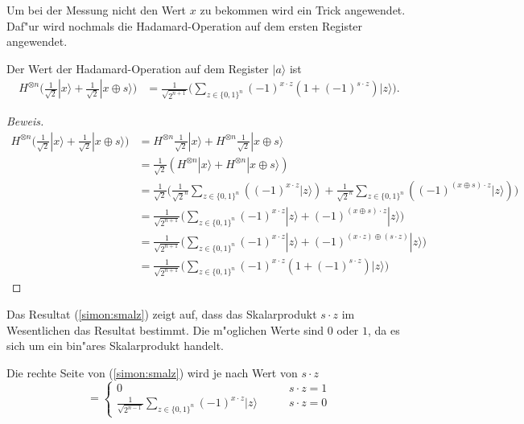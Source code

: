 \begin{refsection}
Um bei der Messung nicht den Wert $x$ zu bekommen wird ein Trick angewendet.
Daf"ur wird nochmals die Hadamard-Operation auf dem ersten Register angewendet.
\begin{hilfssatz}
Der Wert der Hadamard-Operation auf dem Register $|a\rangle$ ist
  \begin{align}
    H^{ \otimes n } \biggl( 
                     \frac{1}{\sqrt{2}} |x\rangle + 
                     \frac{1}{\sqrt{2}} |x \oplus s\rangle 
                     \biggr)
    &= \frac1{\sqrt{2^{n + 1}}}
       \biggl( 
          \sum_{z \in \{0,1\}^n}  { (-1)^{x \cdot z} ( 1 + (-1)^{ s \cdot z}) |z\rangle } 
       \biggr).
  \label{simon:smalz}
\end{align}
\end{hilfssatz}

\begin{proof}[Beweis]
\begin{align*}
    H^{ \otimes n } \biggl( 
                     \frac{1}{\sqrt{2}} |x\rangle + 
                     \frac{1}{\sqrt{2}} |x \oplus s\rangle 
                     \biggr)
    &= H^{ \otimes n } \frac{1}{\sqrt{2}} |x\rangle + 
       H^{ \otimes n } \frac{1}{\sqrt{2}} |x \oplus s\rangle 
    \\ 
    &= \frac1{\sqrt{2}} ( H^{ \otimes n } |x\rangle + H^{ \otimes n } |x \oplus s\rangle )
    \\
    &= \frac1{\sqrt{2}}
       \biggl( \frac1{\sqrt{2}^n} \sum_{z \in \{0,1\}^n} {( (-1)^{x \cdot z} |z\rangle )} + 
               \frac1{\sqrt{2}^n}  \sum_{z \in \{0,1\}^n} { ( (-1)^{(x \oplus s) \cdot z } |z\rangle)}
       \biggr)
    \\
    &= \frac1{\sqrt{2^{n + 1}}}
       \biggl( \sum_{z \in \{0,1\}^n}  { 
                   (-1)^{x \cdot z} |z\rangle + (-1)^{(x \oplus s) \cdot z } |z\rangle 
               } 
       \biggr)
    \\
    &= \frac1{\sqrt{2^{n + 1}}}
       \biggl( \sum_{z \in \{0,1\}^n}  { 
                  (-1)^{x \cdot z} |z\rangle + (-1)^{(x \cdot z) \oplus ( s \cdot z) } |z\rangle 
               } 
       \biggr)
    \\
    &= \frac1{\sqrt{2^{n + 1}}}
       \biggl( 
          \sum_{z \in \{0,1\}^n}  { (-1)^{x \cdot z} ( 1 + (-1)^{ s \cdot z}) |z\rangle } 
       \biggr)
\end{align*}
\end{proof}

Das Resultat (\ref{simon:smalz}) zeigt auf, dass das Skalarprodukt $s \cdot z$ im Wesentlichen das
Resultat bestimmt. Die m"oglichen Werte sind $0$ oder $1$, da es sich um ein
bin"ares Skalarprodukt handelt.
\begin{hilfssatz}
  Die rechte Seite von (\ref{simon:smalz}) wird je nach Wert von $s \cdot z$
  \[
    =\begin{cases}
      0 & \qquad s \cdot z = 1 \\
     \displaystyle \frac1{\sqrt{2^{n - 1}}} \sum_{z \in \{0,1\}^n}  { (-1)^{x \cdot
     z}|z\rangle } & \qquad s \cdot z = 0
    \end{cases}
  \]
\end{hilfssatz}


\end{refsection}
